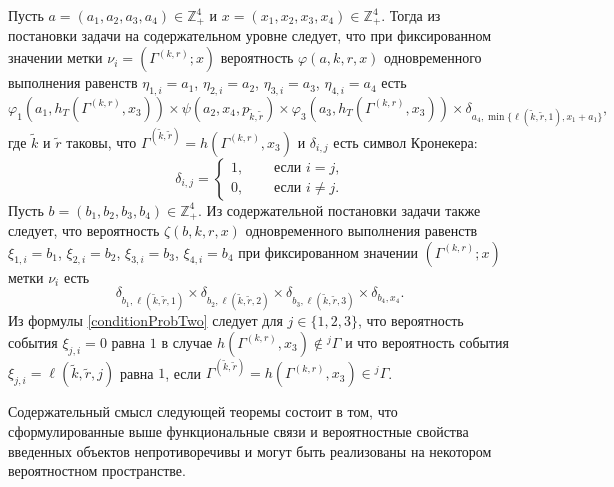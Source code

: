 \documentclass{report}
\begin{document}
Пусть $a=(a_1, a_2, a_3, a_4) \in \mathbb{Z}_+^4$ и $x=(x_1, x_2, x_3, x_4) \in \mathbb{Z}_+^4$. Тогда из постановки задачи на содержательном уровне следует, что при фиксированном значении метки $\nu_i=(\Gamma^{(k,r)}; x)$ вероятность $\varphi(a,k,r,x)$ одновременного выполнения равенств $\eta_{1,i}=a_1$, $\eta_{2,i}=a_2$, $\eta_{3,i}=a_3$, $\eta_{4,i}=a_4$ есть 
\begin{equation}
\varphi_1(a_1,h_T(\Gamma^{(k,r)},x_3)) \times \psi(a_2,x_4, p_{\tilde{k},\tilde{r}}) \times \varphi_3(a_3,h_T(\Gamma^{(k,r)},x_3))
\times \delta_{a_4,\min{\{\ell(\tilde{k},\tilde{r},1), x_1+a_1}\}},
\label{conditionProbOne}
\end{equation}
где $\tilde{k}$ и $\tilde{r}$ таковы, что $\Gamma^{(\tilde{k},\tilde{r})}=h(\Gamma^{(k,r)},x_3)$ и $\delta_{i,j}$ есть символ Кронекера:
$$
\delta_{i,j}=
\begin{cases} 
1,& \quad \text{ если $i=j$,}\\
0,& \quad \text{ если $i\neq j$.}
\end{cases}
$$%
Пусть $b=(b_1, b_2, b_3, b_4) \in \mathbb{Z}_+^4$. Из содержательной постановки задачи также следует, что вероятность $\zeta(b, k, r, x)$ одновременного выполнения равенств $\xi_{1,i}=b_1$, $\xi_{2,i}=b_2$, $\xi_{3,i}=b_3$, $\xi_{4,i}=b_4$ при фиксированном значении $(\Gamma^{(k,r)}; x)$ метки $\nu_i$ есть
\begin{equation}
\delta_{b_1,\ell(\tilde{k},\tilde{r},1)} \times \delta_{b_2,\ell(\tilde{k},\tilde{r},2)} \times 
\delta_{b_3,\ell(\tilde{k},\tilde{r},3)} \times \delta_{b_4,x_4}.
\label{conditionProbTwo}
\end{equation}
Из формулы \eqref{conditionProbTwo} следует для $j\in \{1, 2, 3\}$, что вероятность события $\xi_{j,i}=0$ равна $1$ в случае $h(\Gamma^{(k,r)},x_3)\notin {}^j\Gamma$ и что вероятность события $\xi_{j,i}=\ell(\tilde{k},\tilde{r},j)$ равна $1$, если $\Gamma^{(\tilde{k},\tilde{r})}=h(\Gamma^{(k,r)},x_3)\in {}^j\Gamma$.


Содержательный смысл следующей теоремы состоит в том, что сформулированные выше функциональные связи и вероятностные свойства введенных объектов непротиворечивы и могут быть реализованы на некотором вероятностном пространстве.
\end{document}
